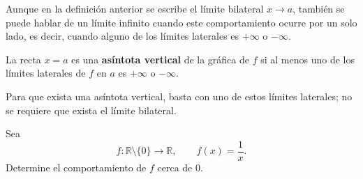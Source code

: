 \documentclass[10pt,a5paper]{article}
\newif\ifmostrarSoluciones
\begin{document}
Aunque en la definición anterior se escribe el límite bilateral $x\to a$, también se puede hablar de un límite infinito cuando este comportamiento ocurre por un solo lado, es decir, cuando alguno de los límites laterales es $+\infty$ o $-\infty$.

\begin{definicion}
La recta $x=a$ es una \textbf{asíntota vertical} de la gráfica de $f$ si al menos uno de los límites laterales de $f$ en $a$ es $+\infty$ o $-\infty$.
\end{definicion}

Para que exista una asíntota vertical, basta con uno de estos límites laterales; no se requiere que exista el límite bilateral.

\begin{ejemplo}
Sea
\[
  f\colon\mathbb{R}\setminus\{0\}\longrightarrow\mathbb{R},
  \qquad
  f(x)=\frac{1}{x}.
\]
Determine el comportamiento de $f$ cerca de $0$.
\end{ejemplo}
\ifmostrarSoluciones
\begin{solucion}
Cuando $x<0$, el número $x$ es negativo y se aproxima a $0$; por tanto, su recíproco decrece sin cota. Cuando $x>0$, el número $x$ es positivo y se aproxima a $0$; por tanto, su recíproco crece sin cota. Así,
\[
  \lim_{x\to0^-}\frac{1}{x}=-\infty,
  \qquad
  \lim_{x\to0^+}\frac{1}{x}=+\infty.
\]
La recta $x=0$ es una asíntota vertical. Como los comportamientos laterales tienen signos diferentes, no se escribe un único límite bilateral igual a $+\infty$ o a $-\infty$.
\end{solucion}
\else\vspace{20mm}\fi

\begin{center}
\end{center}
\end{document}
